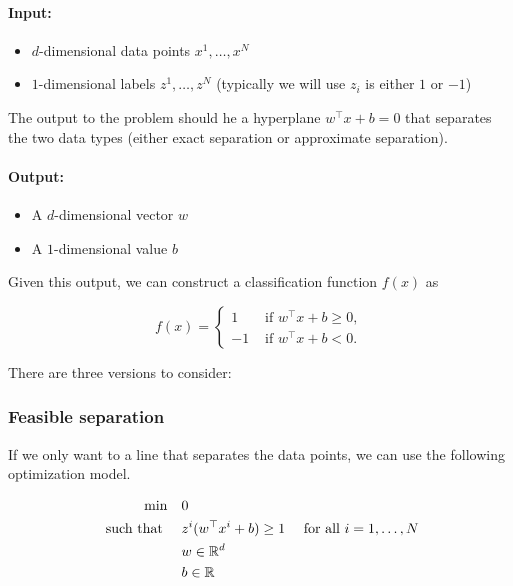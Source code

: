 \documentclass[../open-optimization/open-optimization.tex]{subfiles}
\begin{document}
\paragraph{Input:}
\begin{itemize}
\item $d$-dimensional data points $x^1, \dots, x^N$ 
\item $1$-dimensional labels $z^1, \dots, z^N$  (typically we will use $z_i$ is either $1$  or $-1$)
\end{itemize}

The output to the problem should he a hyperplane $w^\top x + b = 0$ that separates the two data types (either exact separation or approximate separation).

\paragraph{Output:}
\begin{itemize}
\item A $d$-dimensional vector $w$
\item A $1$-dimensional value $b$
\end{itemize}

Given this output, we can construct a classification function $f(x)$ as 

\begin{equation}
f(x) = \begin{cases}
1 & \text{ if } w^\top x + b \geq 0,\\
-1 & \text{ if } w^\top x + b < 0.
\end{cases}
\end{equation}




There are three versions to consider:

\subsubsection{Feasible separation}

If we only want to a line that separates the data points, we can use the following optimization model.

\begin{align*}
\min \quad & 0 \\
\text{ such that } \quad & z^i( w^\top x^i + b) \geq 1 & \text{ for all } i=1, \dots, N\\
& w  \in {\mathbb{R}}^d\\
& b \in {\mathbb{R}}
\end{align*}
\end{document}

